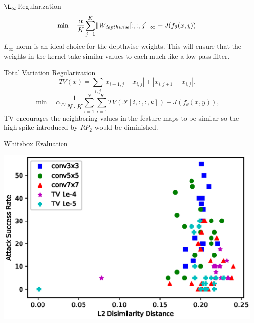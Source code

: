 \documentclass{beamer}
\begin{document}
\begin{frame}{$\L_{\infty}$Regularization}
\begin{equation*}
\centering
	\min \quad \frac{\alpha}{K}\sum_{j = 1}^{K}\lVert W_{depthwise}[:,:,j] \rVert_{\infty} + J(f_\theta(x, y))
\end{equation*}
\pause
$L_{\infty}$ norm is an ideal choice for the depthwise weights. This will ensure that the weights in the kernel take similar values to each much like a low pass filter.
\end{frame}

\begin{frame}{Total Variation Regularization}
\centering
\begin{equation*}
TV(x) = \sum_{i,j} |x_{i + 1, j} - x_{i,j}| + |x_{i, j + 1} - x_{i,j}|.
\end{equation*}
\pause
\begin{equation*}
\min \quad \alpha_{TV} \frac{1}{N \cdot K}\sum_{i = 1}^{N}\sum_{i = 1}^{K} TV(\mathcal{F}[i,:,:,k]) + J(f_\theta(x, y)),
\end{equation*}
\pause
TV encourages the neighboring values in the feature maps to be similar so the high spike introduced by $RP_2$ would be diminished.
\end{frame}



\begin{frame}{Whitebox Evaluation}
\begin{center}
	\includegraphics[scale=0.6]{L2vsAttkplot.eps}
\end{center}
\end{frame}
\end{document}
